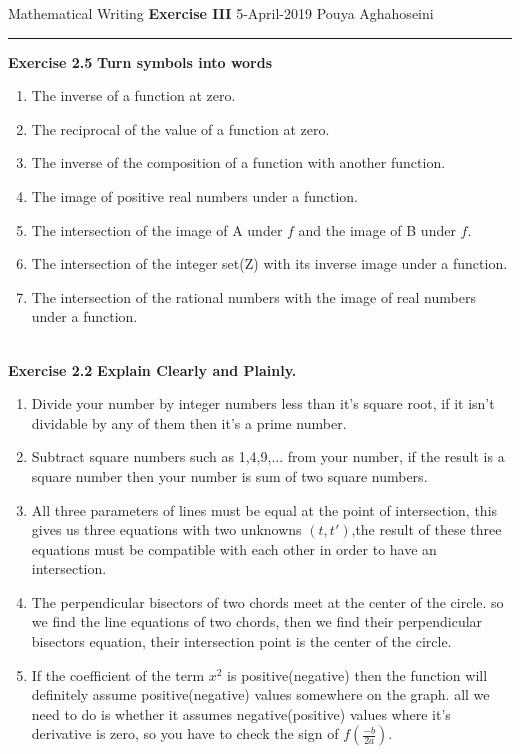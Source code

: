 \documentclass{article}
\begin{document}
\noindent
Mathematical Writing \hfill \textbf{Exercise III} \newline 
{5-April-2019} \hfill Pouya Aghahoseini

\noindent
\rule{\linewidth}{0.4pt}
\textbf{\large\color{blue} Exercise 2.5}   \textbf{Turn symbols into words}
	\begin{enumerate}
		\item 
		The inverse of a function at zero.
		\item
		The reciprocal of the value of a function at zero.
		\item 
		The inverse of the composition of a function with another function.
		\item 
		The image of positive real numbers under a function.
		\item 
		The intersection of the image of A under $f$ and the image of B under $f$.
		\item 
		The intersection of the integer set(Z) with its inverse image under a function.
		\item 
		The intersection of the rational numbers with the image of real numbers under a function.
	\end{enumerate}
	
\text{}\\
\textbf{\large\color{blue} Exercise 2.2}   \textbf{Explain Clearly and Plainly.}
	\begin{enumerate}
		\item 
		Divide your number by integer numbers less than it's square root, if it isn't dividable by any of them then it's a prime number.
		\item 
		Subtract square numbers such as 1,4,9,... from your number, if the result is a square number then your number is sum of two square numbers.
		\item 
		All three parameters of lines must be equal at the point of intersection, this gives us three equations with two unknowns $(t,t')$,the result of these three equations must be compatible with each other in order to have an intersection.
		\item
		The perpendicular bisectors of two chords meet at the center of the circle. so we find the line equations of two chords, then we find their perpendicular bisectors equation, their intersection point is the center of the circle.
		\item 
		If the coefficient of the term $x^{2}$ is positive(negative) then the function will definitely assume positive(negative) values somewhere on the graph. all we need to do is whether it assumes negative(positive) values where it's derivative is zero, so you have to check the sign of $f(\frac{-b}{2a})$. 
	\end{enumerate}
\end{document}

